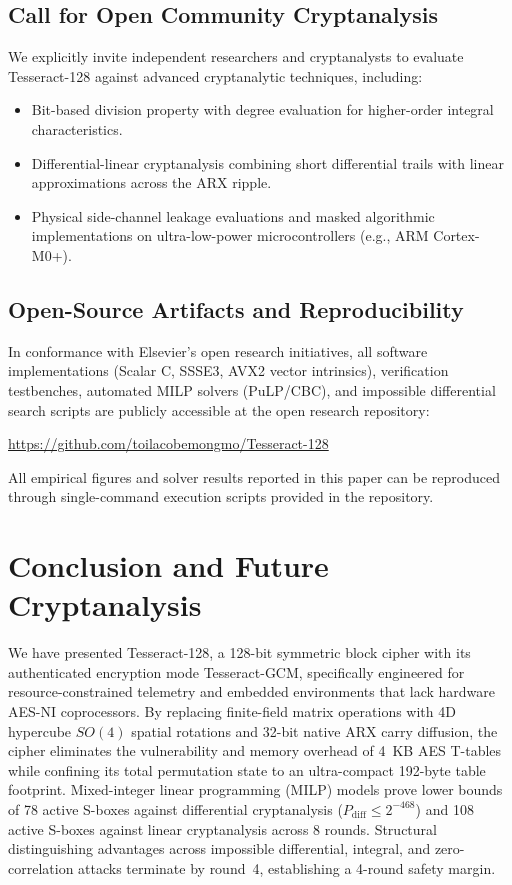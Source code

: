 \documentclass[10pt,twocolumn]{article}
\begin{document}
\subsection{Call for Open Community Cryptanalysis}
We explicitly invite independent researchers and cryptanalysts to evaluate Tesseract-128 against advanced cryptanalytic techniques, including:
\begin{itemize}
    \item Bit-based division property with degree evaluation for higher-order integral characteristics.
    \item Differential-linear cryptanalysis combining short differential trails with linear approximations across the ARX ripple.
    \item Physical side-channel leakage evaluations and masked algorithmic implementations on ultra-low-power microcontrollers (e.g., ARM Cortex-M0+).
\end{itemize}

\subsection{Open-Source Artifacts and Reproducibility}
In conformance with Elsevier's open research initiatives, all software implementations (Scalar C, SSSE3, AVX2 vector intrinsics), verification testbenches, automated MILP solvers (PuLP/CBC), and impossible differential search scripts are publicly accessible at the open research repository:
\begin{center}
    \url{https://github.com/toilacobemongmo/Tesseract-128}
\end{center}
All empirical figures and solver results reported in this paper can be reproduced through single-command execution scripts provided in the repository.

\section{Conclusion and Future Cryptanalysis}
\label{sec:conclusion}
We have presented Tesseract-128, a 128-bit symmetric block cipher with its authenticated encryption mode Tesseract-GCM, specifically engineered for resource-constrained telemetry and embedded environments that lack hardware AES-NI coprocessors. By replacing finite-field matrix operations with 4D hypercube $SO(4)$ spatial rotations and 32-bit native ARX carry diffusion, the cipher eliminates the vulnerability and memory overhead of 4~KB AES T-tables while confining its total permutation state to an ultra-compact 192-byte table footprint. Mixed-integer linear programming (MILP) models prove lower bounds of 78 active S-boxes against differential cryptanalysis ($P_{\text{diff}} \le 2^{-468}$) and 108 active S-boxes against linear cryptanalysis across 8 rounds. Structural distinguishing advantages across impossible differential, integral, and zero-correlation attacks terminate by round~4, establishing a 4-round safety margin.
\end{document}
